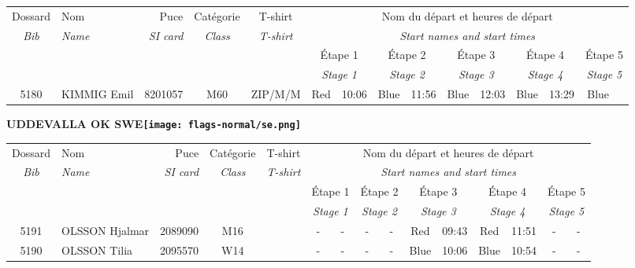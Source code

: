\documentclass{report}
\begin{document}
  \begin{longtable}{|c|l|r|c|c|*{5}{cc|}}
    Dossard & Nom  & Puce    & Catégorie & T-shirt & \multicolumn{10}{c|}{Nom du départ et heures de départ} \\
    \itshape Bib     & \itshape Name & \itshape SI card & \itshape Class  & \itshape  T-shirt  & \multicolumn{10}{c|}{\itshape Start names and start times} \\
    \hline
    & & & & & \multicolumn{2}{c|}{Étape 1} & \multicolumn{2}{c|}{Étape 2} & \multicolumn{2}{c|}{Étape 3} & \multicolumn{2}{c|}{Étape 4} & \multicolumn{2}{c|}{Étape 5} \\
    & & & & & \multicolumn{2}{c|}{\itshape Stage 1} & \multicolumn{2}{c|}{\itshape Stage 2} & \multicolumn{2}{c|}{\itshape Stage 3} & \multicolumn{2}{c|}{\itshape Stage 4} & \multicolumn{2}{c|}{\itshape Stage 5} \\
    \hline
    5180 & KIMMIG Emil & 8201057 & M60 & ZIP/M/M & Red & 10:06 & Blue & 11:56 & Blue & 12:03 & Blue & 13:29 & Blue &  \\
  \end{longtable}
\newpage
  \Huge \centering \bfseries UDDEVALLA OK  SWE\normalfont \footnotesize \sffamily \hfill \texttt{[image: flags-normal/se.png]} \newline 
  \begin{longtable}{|c|l|r|c|c|*{5}{cc|}}
    Dossard & Nom  & Puce    & Catégorie & T-shirt & \multicolumn{10}{c|}{Nom du départ et heures de départ} \\
    \itshape Bib     & \itshape Name & \itshape SI card & \itshape Class  & \itshape  T-shirt  & \multicolumn{10}{c|}{\itshape Start names and start times} \\
    \hline
    & & & & & \multicolumn{2}{c|}{Étape 1} & \multicolumn{2}{c|}{Étape 2} & \multicolumn{2}{c|}{Étape 3} & \multicolumn{2}{c|}{Étape 4} & \multicolumn{2}{c|}{Étape 5} \\
    & & & & & \multicolumn{2}{c|}{\itshape Stage 1} & \multicolumn{2}{c|}{\itshape Stage 2} & \multicolumn{2}{c|}{\itshape Stage 3} & \multicolumn{2}{c|}{\itshape Stage 4} & \multicolumn{2}{c|}{\itshape Stage 5} \\
    \hline
    5191 & OLSSON Hjalmar & 2089090 & M16 &   & - &  - & - &  - & Red & 09:43 & Red & 11:51 & - &  -\\
    5190 & OLSSON Tilia & 2095570 & W14 &   & - &  - & - &  - & Blue & 10:06 & Blue & 10:54 & - &  -\\
  \end{longtable}
\end{document}
